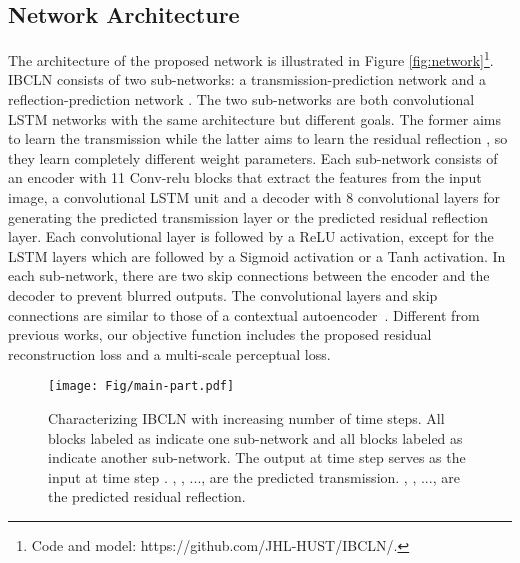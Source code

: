 \documentclass[10pt,twocolumn,letterpaper]{article}
\begin{document}
\subsection{Network Architecture}
The architecture of the proposed network is illustrated in Figure \ref{fig:network}\footnote{Code and model: https://github.com/JHL-HUST/IBCLN/.}. IBCLN consists of two sub-networks: a transmission-prediction network  and a reflection-prediction network . The two sub-networks are both convolutional LSTM networks with the same architecture but different goals. The former aims to learn the transmission  while the latter aims to learn the residual reflection , so they learn completely different weight parameters. Each sub-network consists of an encoder with 11 Conv-relu blocks that extract the features from the input image, a convolutional LSTM unit \cite{xingjian2015convolutional} and a decoder with 8 convolutional layers for generating the predicted transmission layer or the predicted residual reflection layer. Each convolutional layer is followed by a ReLU activation, except for the LSTM layers which are followed by a Sigmoid activation or a Tanh activation. In each sub-network, there are two skip connections between the encoder and the decoder to prevent blurred outputs. The convolutional layers and skip connections are similar to those of a contextual autoencoder~\cite{qian2018attentive}. Different from previous works, our objective function includes the proposed residual reconstruction loss and a multi-scale perceptual loss. 

\begin{figure}[htbp]
    \begin{center}
        \texttt{[image: Fig/main-part.pdf]}
    \end{center}
    \vspace{-0.5em}
    \caption{Characterizing IBCLN with increasing number of time steps. All blocks labeled as  indicate one sub-network and all blocks labeled as  indicate another sub-network. The output at time step  serves as the input at time step .  , , ...,  are the predicted transmission. , , ...,  are the predicted residual reflection.
    }
    \label{fig:main-part}
    \vspace{-0.5em}
\end{figure}
\end{document}

